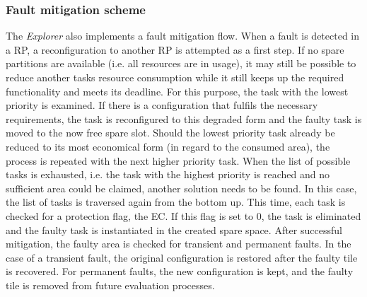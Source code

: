 \subsubsection{Fault mitigation scheme}
The \textit{Explorer} also implements a fault mitigation flow.
When a fault is detected in a \gls{RP}, a reconfiguration to another \gls{RP} is attempted as a first step.
If no spare partitions are available (i.e. all resources are in usage), it may still be possible to reduce another tasks resource consumption while it still keeps up the required functionality and meets its deadline.
For this purpose, the task with the lowest priority is examined.
If there is a configuration that fulfils the necessary requirements, the task is reconfigured to this degraded form and the faulty task is moved to the now free spare slot.
Should the lowest priority task already be reduced to its most economical form (in regard to the consumed area), the process is repeated with the next higher priority task. 
When the list of possible tasks is exhausted, i.e. the task with the highest priority is reached and no sufficient area could be claimed, another solution needs to be found. 
In this case, the list of tasks is traversed again from the bottom up. 
This time, each task is checked for a protection flag, the \gls{EC}. 
If this flag is set to 0, the task is eliminated and the faulty task is instantiated in the created spare space.
After successful mitigation, the faulty area is checked for transient and permanent faults. 
In the case of a transient fault, the original configuration is restored after the faulty tile is recovered. 
For permanent faults, the new configuration is kept, and the faulty tile is removed from future evaluation processes. 
